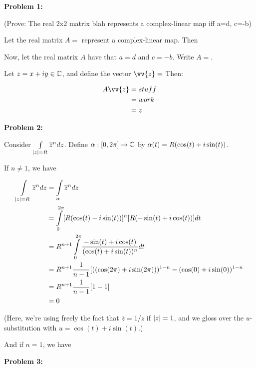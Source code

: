 \documentclass[a4paper,12pt]{article}
\begin{document}
{\bf Problem 1:}

(Prove: The real 2x2 matrix blah represents a complex-linear map iff a=d, c=-b)

Let the real matrix $A = $ represent a complex-linear map. Then %

Now, let the real matrix $A$ have that $a=d$ and $c=-b$. Write $A=$.

Let $z=x+iy \in \mathbb{C}$, and define the vector $\vv{z}=$ Then:

\begin{align*}
A\vv{z} &= stuff \\
&=work\\
&=z
\end{align*}

\shunt

{\bf Problem 2:}

Consider $\int\limits_{\left\lvert z \right\rvert = R} \overline{z}^n dz$. Define $\alpha: [0,2\pi] \to \mathbb{C}$ by $\alpha(t) = R(\cos(t)+i\sin(t))$.

If $n \neq 1$, we have

\begin{align*}
\int\limits_{\left\lvert z \right\rvert = R} \overline{z}^n dz &= \int\limits_\alpha \overline{z}^n dz\\
&= \int\limits_0^{2\pi} [R(\cos(t) - i \sin(t))]^n [R(-\sin(t)+i\cos(t))] dt \\
&=R^{n+1}\int\limits_0^{2\pi} \frac{-\sin(t)+i\cos(t)}{(\cos(t)+i\sin(t))^n}dt\\
&= R^{n+1} \frac{1}{n-1} [((\cos(2\pi)+i\sin(2\pi)))^{1-n} - (\cos(0)+i\sin(0))^{1-n}\\
&= R^{n+1} \frac{1}{n-1} [1-1]\\
&= 0
\end{align*}

(Here, we're using freely the fact that $\overline{z} = 1/z$ if $\left\lvert z \right\rvert=1$, and we gloss over the $u$-substitution with $u = \cos(t)+i\sin(t)$.)

And if $n=1$, we have


\shunt

{\bf Problem 3:}

\shunt
\end{document}
